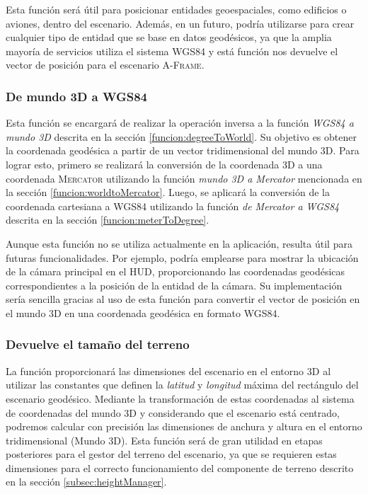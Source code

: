 \documentclass[a4paper, 11pt]{book}
\begin{document}
Esta función será útil para posicionar entidades geoespaciales, como edificios o aviones, dentro del escenario. Además, en un futuro, podría utilizarse para crear cualquier tipo de entidad que se base en datos geodésicos, ya que la amplia mayoría de servicios utiliza el sistema \textsc{WGS84} y está función nos devuelve el vector de posición para el escenario \textsc{A-Frame}.

\subsubsection{De mundo 3D a WGS84}
\label{funcion:worldToDegree}
Esta función se encargará de realizar la operación inversa a la función \emph{WGS84 a mundo 3D} descrita en la sección \ref{funcion:degreeToWorld}. Su objetivo es obtener la coordenada geodésica a partir de un vector tridimensional del mundo 3D. Para lograr esto, primero se realizará la conversión de la coordenada \textsc{3D} a una coordenada \textsc{Mercator} utilizando la función \emph{mundo 3D a Mercator} mencionada en la sección \ref{funcion:worldtoMercator}. Luego, se aplicará la conversión de la coordenada cartesiana a \textsc{WGS84} utilizando la función \emph{de Mercator a WGS84} descrita en la sección \ref{funcion:meterToDegree}.

Aunque esta función no se utiliza actualmente en la aplicación, resulta útil para futuras funcionalidades. Por ejemplo, podría emplearse para mostrar la ubicación de la cámara principal en el \textsc{HUD}, proporcionando las coordenadas geodésicas correspondientes a la posición de la entidad de la cámara. Su implementación sería sencilla gracias al uso de esta función para convertir el vector de posición en el mundo 3D en una coordenada geodésica en formato \textsc{WGS84}.

\subsubsection{Devuelve el tamaño del terreno}
\label{funcion:getGroundSize}
La función proporcionará las dimensiones del escenario en el entorno \textsc{3D} al utilizar las constantes que definen la \emph{latitud} y \emph{longitud} máxima del rectángulo del escenario geodésico. Mediante la transformación de estas coordenadas al sistema de coordenadas del mundo \textsc{3D} y considerando que el escenario está centrado, podremos calcular con precisión las dimensiones de anchura y altura en el entorno tridimensional (Mundo 3D). Esta función será de gran utilidad en etapas posteriores para el gestor del terreno del escenario, ya que se requieren estas dimensiones para el correcto funcionamiento del componente de terreno descrito en la sección \ref{subsec:heightManager}.
\end{document}
